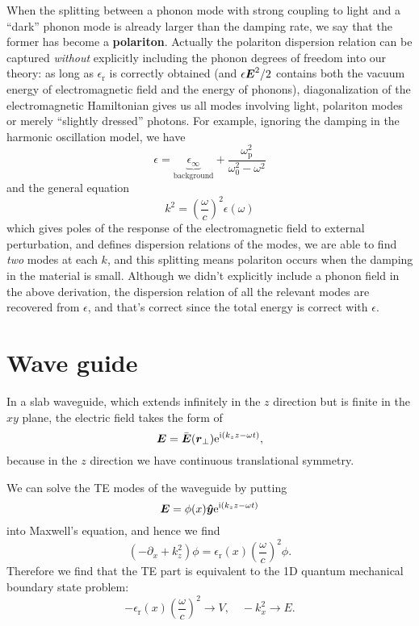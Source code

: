 \documentclass[hyperref, a4paper]{article}
\newcommand*{\ii}{\mathrm{i}}
\newcommand*{\ee}{\mathrm{e}}
\newcommand*{\concept}[1]{{\textbf{#1}}}
\newcommand{\epsr}{\epsilon_{\text{r}}}
\begin{document}
When the splitting between a phonon mode with strong coupling to light 
and a ``dark'' phonon mode 
is already larger than the damping rate, 
we say that the former has become a \concept{polariton}.
Actually the polariton dispersion relation 
can be captured \emph{without} explicitly including 
the phonon degrees of freedom into our theory:
as long as $\epsr$ is correctly obtained 
(and $\epsilon \vb*{E}^2 / 2$ contains both the vacuum energy of electromagnetic field 
and the energy of phonons), 
diagonalization of the electromagnetic Hamiltonian gives us 
all modes involving light, 
polariton modes or merely ``slightly dressed'' photons.
For example, ignoring the damping in the harmonic oscillation model, we have  
\begin{equation}
    \epsilon = \underbrace{\epsilon_{\infty}}_{\text{background}} +
    \frac{
        \omega_{\text{p}}^2
    }{
        \omega_0^2 - \omega^2
    }
\end{equation}
and the general equation 
\begin{equation}
    k^2 = \left(\frac{\omega}{c}\right)^2 \epsilon(\omega)
\end{equation}
which gives poles of the response of the electromagnetic field to external perturbation,
and defines dispersion relations of the modes,
we are able to find \emph{two} modes at each $k$,
and this splitting means polariton occurs when the damping 
in the material is small. 
Although we didn't explicitly include a phonon field in the above derivation, 
the dispersion relation of all the relevant modes are recovered from $\epsilon$,
and that's correct since the total energy is correct with $\epsilon$.

\section{Wave guide}

In a slab waveguide, which extends infinitely in the $z$ direction 
but is finite in the $xy$ plane, the electric field takes the form of 
\begin{equation}
    \vb*{E} = \bar{\vb*{E}}(\vb*{r}_\bot) \ee^{\ii (k_z z - \omega t)},
\end{equation}
because in the $z$ direction we have continuous translational symmetry.

We can solve the TE modes of the waveguide by putting 
\begin{equation}
    \vb*{E} = \phi(x) \vu*{y} \ee^{\ii (k_z z - \omega t)}
\end{equation}
into Maxwell's equation, and hence we find 
\begin{equation}
    (-\partial_x + k_z^2) \phi = \epsr(x) \left(\frac{\omega}{c}\right)^2 \phi.
\end{equation}
Therefore we find that the TE part is equivalent to 
the 1D quantum mechanical boundary state problem:
\begin{equation}
    - \epsr(x) \left(\frac{\omega}{c}\right)^2 \to V, \quad 
    - k_x^2 \to E.
\end{equation}
\end{document}
